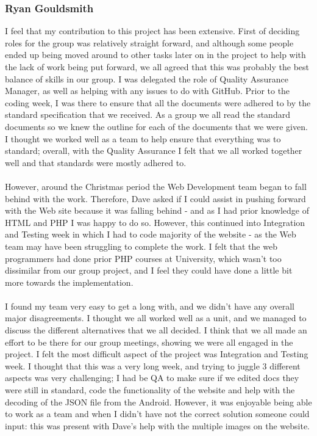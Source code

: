 \documentclass[12pt]{article}
\begin{document}
\subsubsection{Ryan Gouldsmith}
I feel that my contribution to this project has been extensive. First of deciding roles for the group was relatively straight forward, and although some people ended up being moved around to other tasks later on in the project to help with the lack of work being put forward, we all agreed that this was probably the best balance of skills in our group. I was delegated the role of Quality Assurance Manager, as well as helping with any issues to do with GitHub. Prior to the coding week, I was there to ensure that all the documents were adhered to by the standard specification that we received. As a group we all read the standard documents so we knew the outline for each of the documents that we were given. I thought we worked well as a team to help ensure that everything was to standard; overall, with the Quality Assurance I felt that we all worked together well and that standards were mostly adhered to.
~\\\\
However, around the Christmas period the Web Development team began to fall behind with the work. Therefore, Dave asked if I could assist in pushing forward with the Web site because it was falling behind - and as I had prior knowledge of HTML and PHP I was happy to do so. However, this continued into Integration and Testing week in which I had to code majority of the website - as the Web team may have been struggling to complete the work. I felt that the web programmers had done prior PHP courses at University, which wasn't too dissimilar from our group project, and I feel they could have done a little bit more towards the implementation.
~\\\\
I found my team very easy to get a long with, and we didn't have any overall major disagreements. I thought we all worked well as a unit, and we managed to discuss the different alternatives that we all decided. I think that we all made an effort to be there for our group meetings, showing we were all engaged in the project. I felt the most difficult aspect of the project was Integration and Testing week. I thought that this was a very long week, and trying to juggle 3 different aspects was very challenging; I had be QA to make sure if we edited docs they were still in standard, code the functionality of the website and help with the decoding of the JSON file from the Android. However, it was enjoyable being able to work as a team and when I didn't have not the correct solution someone could input: this was present with Dave's help with the multiple images on the website. 
\end{document}
